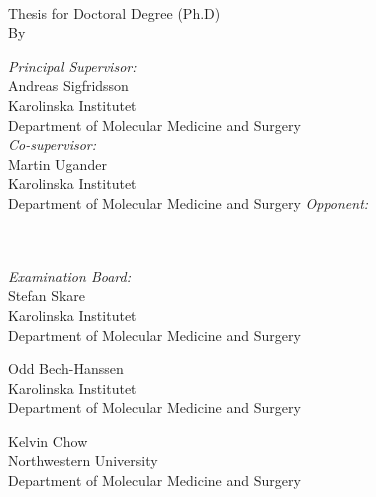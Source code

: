 \newpage 
\thispagestyle{empty} %
{\huge \myMainTitle}\\[6mm]
{\Large Thesis for Doctoral Degree (Ph.D)\\[6mm]
By\\[6mm]
\myName}
\vfill
{\ssmall
\begin{multicols}{2}
\textit{Principal Supervisor:}\\
Andreas Sigfridsson\\
Karolinska Institutet\\
Department of Molecular Medicine and Surgery\\[2mm]
\textit{Co-supervisor:}\\
Martin Ugander\\
Karolinska Institutet\\
Department of Molecular Medicine and Surgery
\vfill
\columnbreak
\textit{Opponent:}\\
\myOpponent\\
\myOpponentAffiliation\\
\myOpponentDepartment

\textit{Examination Board:}\\
Stefan Skare\\
Karolinska Institutet\\
Department of Molecular Medicine and Surgery

Odd Bech-Hanssen\\
Karolinska Institutet\\
Department of Molecular Medicine and Surgery

Kelvin Chow\\
Northwestern University\\
Department of Molecular Medicine and Surgery

\end{multicols}
}
\clearpage